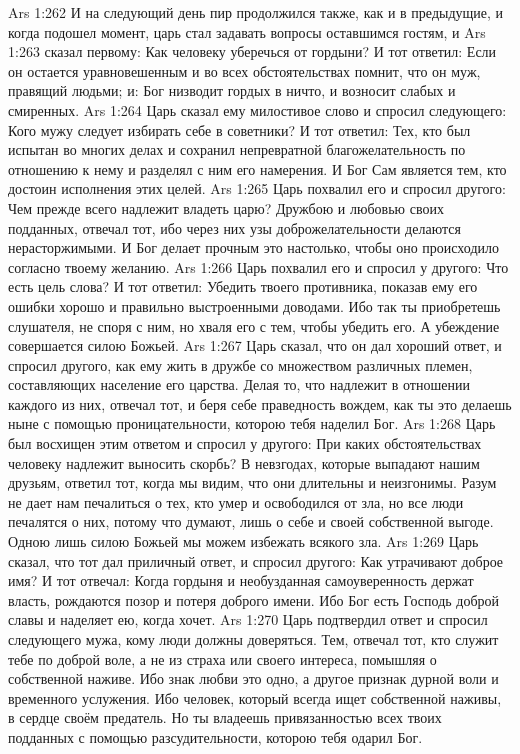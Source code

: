 \vs Ars 1:262
И на следующий день пир продолжился также, как и в предыдущие, и когда подошел момент, царь стал задавать вопросы оставшимся гостям, и
\vs Ars 1:263
сказал первому: Как человеку уберечься от гордыни? И тот ответил: Если он остается уравновешенным и во всех обстоятельствах помнит, что он муж, правящий людьми; и: Бог низводит гордых в ничто, и возносит слабых и смиренных.
\vs Ars 1:264
Царь сказал ему милостивое слово и спросил следующего: Кого мужу следует избирать себе в советники? И тот ответил: Тех, кто был испытан во многих делах и сохранил непревратной благожелательность по отношению к нему и разделял с ним его намерения. И Бог Сам является тем, кто достоин исполнения этих целей.
\vs Ars 1:265
Царь похвалил его и спросил другого: Чем прежде всего надлежит владеть царю? Дружбою и любовью своих подданных, отвечал тот, ибо через них узы доброжелательности делаются нерасторжимыми. И Бог делает прочным это настолько, чтобы оно происходило согласно твоему желанию.
\vs Ars 1:266
Царь похвалил его и спросил у другого: Что есть цель слова? И тот ответил: Убедить твоего противника, показав ему его ошибки хорошо и правильно выстроенными доводами. Ибо так ты приобретешь слушателя, не споря с ним, но хваля его с тем, чтобы убедить его. А убеждение совершается силою Божьей.
\vs Ars 1:267
Царь сказал, что он дал хороший ответ, и спросил другого, как ему жить в дружбе со множеством различных племен, составляющих население его царства. Делая то, что надлежит в отношении каждого из них, отвечал тот, и беря себе праведность вождем, как ты это делаешь ныне с помощью проницательности, которою тебя наделил Бог.
\vs Ars 1:268
Царь был восхищен этим ответом и спросил у другого: При каких обстоятельствах человеку надлежит выносить скорбь? В невзгодах, которые выпадают нашим друзьям, ответил тот, когда мы видим, что они длительны и неизгонимы. Разум не дает нам печалиться о тех, кто умер и освободился от зла, но все люди печалятся о них, потому что думают, лишь о себе и своей собственной выгоде. Одною лишь силою Божьей мы можем избежать всякого зла.
\vs Ars 1:269
Царь сказал, что тот дал приличный ответ, и спросил другого: Как утрачивают доброе имя? И тот отвечал: Когда гордыня и необузданная самоуверенность держат власть, рождаются позор и потеря доброго имени. Ибо Бог есть Господь доброй славы и наделяет ею, когда хочет.
\vs Ars 1:270
Царь подтвердил ответ и спросил следующего мужа, кому люди должны доверяться. Тем, отвечал тот, кто служит тебе по доброй воле, а не из страха или своего интереса, помышляя о собственной наживе. Ибо знак любви это одно, а другое признак дурной воли и временного услужения. Ибо человек, который всегда ищет собственной наживы, в сердце своём предатель. Но ты владеешь привязанностью всех твоих подданных с помощью разсудительности, которою тебя одарил Бог.
